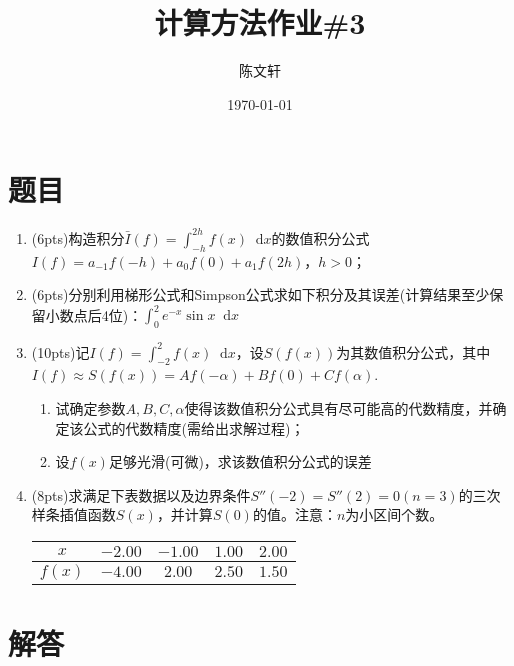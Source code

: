 \documentclass[cn,hazy,green,11pt,normal]{elegantnote}
\title{计算方法作业\#3}
\author{陈文轩}
\institute{KFRC}
\date{\today}
\newcommand*{\diff}{\mathop{}\!\mathrm{d}}
\begin{document}
\maketitle


\section{题目}

    \begin{enumerate}
        \item (6pts)构造积分$\bar{I}(f)=\int_{-h}^{2h}f(x)\diff x$的数值积分公式$I(f)=a_{-1}f(-h)+a_0 f(0)+a_1 f(2h)$，$h>0$；
        \item (6pts)分别利用梯形公式和Simpson公式求如下积分及其误差(计算结果至少保留小数点后4位)：$\int_0^2 e^{-x}\sin x\diff x$
        \item (10pts)记$I(f)=\int_{-2}^2 f(x)\diff x$，设$S(f(x))$为其数值积分公式，其中$I(f)\approx S(f(x))=Af(-\alpha)+Bf(0)+Cf(\alpha)$.
            \begin{enumerate}
                \item 试确定参数$A,B,C,\alpha$使得该数值积分公式具有尽可能高的代数精度，并确定该公式的代数精度(需给出求解过程)；
                \item 设$f(x)$足够光滑(可微)，求该数值积分公式的误差
            \end{enumerate}
        \item (8pts)求满足下表数据以及边界条件$S''(-2)=S''(2)=0(n=3)$的三次样条插值函数$S(x)$，并计算$S(0)$的值。注意：$n$为小区间个数。
            \begin{table}[htb]
                \begin{center}
                    \begin{tabular}{|c|c|c|c|c|}
                    \hline
                    $x$ & $-2.00$ & $-1.00$ & $1.00$ & $2.00$ \\
                    \hline
                    $f(x)$ & $-4.00$ & $2.00$ & $2.50$ & $1.50$ \\
                    \hline
                    \end{tabular}
                \end{center}
            \end{table}
    \end{enumerate}

\section{解答}
\end{document}
